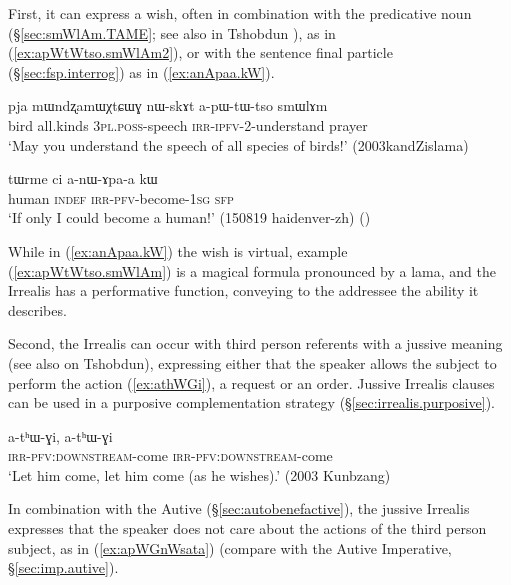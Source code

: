 First, it can express a wish, often in combination with the predicative noun  (§\ref{sec:smWlAm.TAME}; see also in Tshobdun \citealt[804]{jackson07irrealis}), as in (\ref{ex:apWtWtso.smWlAm2}), or with the sentence final particle  (§\ref{sec:fsp.interrog}) as in (\ref{ex:anApaa.kW}).

\begin{exe}
\ex \label{ex:apWtWtso.smWlAm2}
\gll pja mɯndʐamɯχtɕɯɣ nɯ-skɤt a-pɯ-tɯ-tso smɯlɤm\\
bird all.kinds \textsc{3pl}.\textsc{poss}-speech \textsc{irr}-\textsc{ipfv}-2-understand prayer\\
\glt `May you understand the speech of all species of birds!' (2003kandZislama)
\end{exe}

\begin{exe}
\ex \label{ex:anApaa.kW}
\gll tɯrme ci a-nɯ-ɤpa-a kɯ \\
human \textsc{indef} \textsc{irr}-\textsc{pfv}-become-\textsc{1sg} \textsc{sfp} \\
\glt `If only I could become a human!' (150819 haidenver-zh) 
()
\end{exe}
 
While in (\ref{ex:anApaa.kW}) the wish is virtual, example (\ref{ex:apWtWtso.smWlAm}) is a magical formula pronounced by a lama, and the Irrealis has a performative function, conveying to the addressee the ability it describes.


Second, the Irrealis can occur with third person referents with a jussive meaning (see also \citealt[811]{jackson07irrealis} on Tshobdun), expressing either that the speaker allows the subject to perform the action (\ref{ex:athWGi}), a request or an order. Jussive Irrealis clauses can be used in a purposive complementation strategy (§\ref{sec:irrealis.purposive}).

\begin{exe}
\ex \label{ex:athWGi}
\gll a-tʰɯ-ɣi, a-tʰɯ-ɣi \\
\textsc{irr}-\textsc{pfv}:\textsc{downstream}-come \textsc{irr}-\textsc{pfv}:\textsc{downstream}-come \\
\glt `Let him come, let him come (as he wishes).' (2003 Kunbzang)
\end{exe}

In combination with the Autive (§\ref{sec:autobenefactive}), the jussive Irrealis expresses that the speaker does not care about the actions of the third person subject, as in (\ref{ex:apWGnWsata}) (compare with the Autive Imperative, §\ref{sec:imp.autive}).

